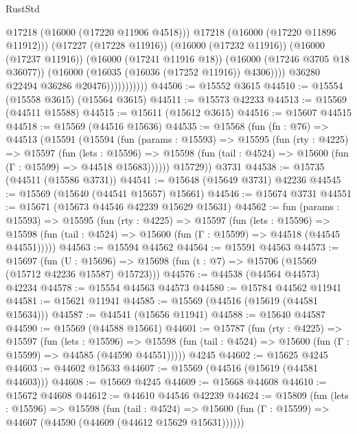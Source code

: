 \begin{lexlean}{RustStd}
\begin{coremodule}
                                  @17218
                                  (@16000 (@17220 @11906 @4518)))
                                @17218
                                (@16000 (@17220 @11896 @11912)))
                              (@17227 (@17228 @11916))
                              (@16000 (@17232 @11916))
                              (@16000 (@17237 @11916))
                              (@16000 (@17241 @11916 @18))
                              (@16000 (@17246 @3705 @18 @36077))
                              (@16000 (@16035 (@16036 (@17252 @11916)) @4306))))
                          @36280
                          @22494
                          @36286
                          @20476)))))))))))
@44506 := @15552 @3615
@44510 := @15554 (@15558 @3615) (@15564 @3615)
@44511 := @15573 @42233
@44513 := @15569 (@44511 @15588)
@44515 := @15611 (@15612 @3615)
@44516 := @15607 @44515
@44518 := @15569 (@44516 @15636)
@44535 := @15568
    (fun (fn : @76) =>
    @44513
      (@15591
        (@15594
          (fun (params : @15593) =>
          @15595
            (fun (rty : @4225) =>
            @15597
              (fun (lets : @15596) =>
              @15598 (fun (tail : @4524) => @15600 (fun (Γ : @15599) => @44518 @15683))))))
        @15729))
    @3731
@44538 := @15735 (@44511 (@15586 @3731))
@44541 := @15648 (@15649 @3731) @42236
@44545 := @15569 (@15640 (@44541 @15657) @15661)
@44546 := @15674 @3731
@44551 := @15671 (@15673 @44546 @42239 @15629 @15631)
@44562 := fun (params : @15593) =>
  @15595
    (fun (rty : @4225) =>
    @15597
      (fun (lets : @15596) =>
      @15598 (fun (tail : @4524) => @15600 (fun (Γ : @15599) => @44518 (@44545 @44551)))))
@44563 := @15594 @44562
@44564 := @15591 @44563
@44573 := @15697
    (fun (U : @15696) => @15698 (fun (t : @7) => @15706 (@15569 (@15712 @42236 @15587) @15723)))
@44576 := @44538 (@44564 @44573) @42234
@44578 := @15554 @44563 @44573
@44580 := @15784 @44562 @11941
@44581 := @15621 @11941
@44585 := @15569 (@44516 (@15619 (@44581 @15634)))
@44587 := @44541 (@15656 @11941)
@44588 := @15640 @44587
@44590 := @15569 (@44588 @15661)
@44601 := @15787
    (fun (rty : @4225) =>
    @15597
      (fun (lets : @15596) =>
      @15598 (fun (tail : @4524) => @15600 (fun (Γ : @15599) => @44585 (@44590 @44551)))))
    @4245
@44602 := @15625 @4245
@44603 := @44602 @15633
@44607 := @15569 (@44516 (@15619 (@44581 @44603)))
@44608 := @15669 @4245
@44609 := @15668 @44608
@44610 := @15672 @44608
@44612 := @44610 @44546 @42239
@44624 := @15809
    (fun (lets : @15596) =>
    @15598
      (fun (tail : @4524) =>
      @15600 (fun (Γ : @15599) => @44607 (@44590 (@44609 (@44612 @15629 @15631))))))

\end{coremodule}
\end{lexlean}
